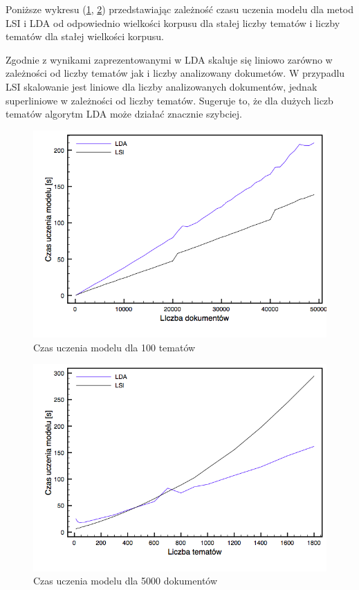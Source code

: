 \documentclass[11pt,a4paper]{article}
\begin{document}
Poniższe wykresu (\ref{time-docs}, \ref{time-topics}) przedstawiając zależność
czasu uczenia modelu dla metod LSI i LDA od odpowiednio wielkości korpusu
dla stałej liczby tematów i liczby tematów dla stałej wielkości korpusu.

Zgodnie z wynikami zaprezentowanymi w \cite{gensim-algorithm} LDA skaluje się
liniowo zarówno w zależności od liczby tematów jak i liczby analizowany
dokumetów. W przypadlu LSI skalowanie jest liniowe dla liczby analizowanych
dokumentów, jednak superliniowe w zależności od liczby tematów. Sugeruje to, że
dla dużych liczb tematów algorytm LDA może działać znacznie szybciej.

\begin{figure}[h]
\includegraphics[width=\linewidth]{gfx/time_docs.png}
\caption{Czas uczenia modelu dla 100 tematów}
\label{time-docs}
\end{figure}

\begin{figure}[h]
\includegraphics[width=\linewidth]{gfx/time_topics.png}
\caption{Czas uczenia modelu dla 5000 dokumentów}
\label{time-topics}
\end{figure}
\end{document}
